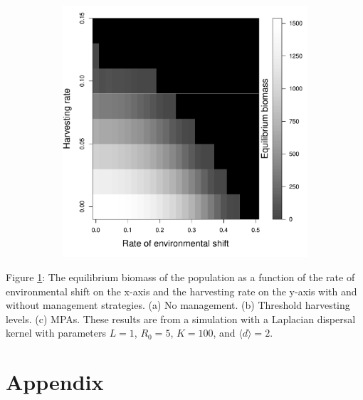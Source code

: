 \documentclass[12pt,english]{article}
\begin{document}
\begin{spacing}{1.9}
\begin{flushleft}
\begin{figure}[htbp]
\begin{subfigure}{.33\textwidth}
\end{subfigure}
\begin{subfigure}{.33\textwidth}
\subcaption{}
\includegraphics[width=\textwidth]{plots/eqbiomass_mpa.pdf}
\end{subfigure}
\caption{
}
\label{management}
\end{figure}

\pagebreak

Figure \ref{management}: The equilibrium biomass of the population as a function of the rate of environmental shift on the x-axis and the harvesting rate on the y-axis with and without management strategies.  (a) No management.  (b) Threshold harvesting levels.  (c) MPAs.  These results are from a simulation with a Laplacian dispersal kernel with parameters $L=1$, $R_0=5$, $K=100$, and $\langle d \rangle =2$.

\pagebreak

\section{Appendix}


\end{flushleft}
\end{spacing}
\end{document}
